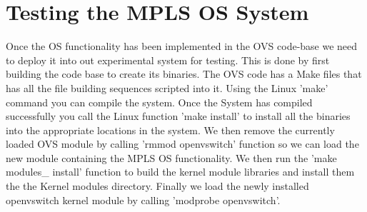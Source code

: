 \section{Testing the MPLS OS System}
Once the OS functionality has been implemented in the OVS code-base we need to deploy it into out experimental system for testing. This is done by first building the code base to create its binaries. The OVS code has a Make files that has all the file building sequences scripted into it. Using the Linux 'make' command you can compile the system. Once the System has compiled successfully you call the Linux function 'make install' to install all the binaries into the appropriate locations in the system. We then remove the currently loaded OVS module by calling 'rmmod openvswitch' function so we can load the new module containing the MPLS OS functionality. We then run the 'make modules\_ install' function to build the kernel module libraries and install them the the Kernel modules directory. Finally we load the newly installed openvswitch kernel module by calling 'modprobe openvswitch'.

